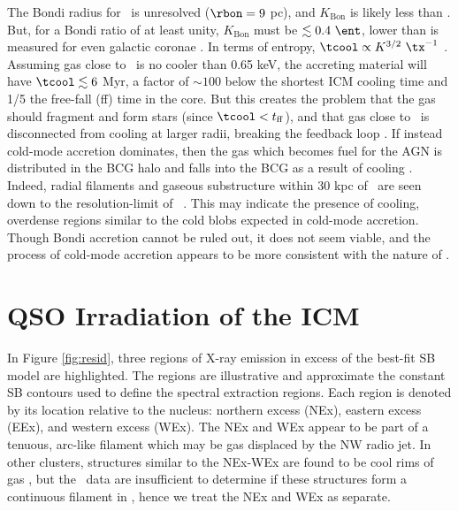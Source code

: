 \documentclass[useAMS,usenatbib]{mn2e}
\begin{document}
The Bondi radius for \irs\ is unresolved ($\rbon = 9$ pc), and
$K_{\mathrm{Bon}}$ is likely less than \kna. But, for a Bondi ratio of
at least unity, $K_{\mathrm{Bon}}$ must be $\la 0.4 ~\ent$, lower than
is measured for even galactic coronae \citep{coronae}. In terms of
entropy, $\tcool \propto K^{3/2} ~\tx^{-1}$ \citep{d06}. Assuming gas
close to \rbon\ is no cooler than 0.65 keV, the accreting material
will have $\tcool \la 6$ Myr, a factor of $\sim 100$ below the
shortest ICM cooling time and 1/5 the free-fall (ff) time in the
core. But this creates the problem that the gas should fragment and
form stars (since $\tcool < t_{\rm{ff}}$), and that gas close to
\rbon\ is disconnected from cooling at larger radii, breaking the
feedback loop \citep{2006NewA...12...38S}. If instead cold-mode
accretion dominates, then the gas which becomes fuel for the AGN is
distributed in the BCG halo and falls into the BCG as a result of
cooling \citep{pizzolato05, 2010arXiv1003.4181P}. Indeed, radial
filaments and gaseous substructure within 30 kpc of \irs\ are seen
down to the resolution-limit of
\hst\ \citep{1999Ap&SS.266..113A}. This may indicate the presence of
cooling, overdense regions similar to the cold blobs expected in
cold-mode accretion. Though Bondi accretion cannot be ruled out, it
does not seem viable, and the process of cold-mode accretion appears
to be more consistent with the nature of \irs.

\section{QSO Irradiation of the ICM}
\label{sec:excess}

In Figure \ref{fig:resid}, three regions of X-ray emission in excess
of the best-fit SB model are highlighted. The regions are illustrative
and approximate the constant SB contours used to define the spectral
extraction regions. Each region is denoted by its location relative to
the nucleus: northern excess (NEx), eastern excess (EEx), and western
excess (WEx). The NEx and WEx appear to be part of a tenuous, arc-like
filament which may be gas displaced by the NW radio jet. In other
clusters, structures similar to the NEx-WEx are found to be cool rims
of gas \citep[\eg][]{2009ApJ...697L..95B}, but the \cxo\ data are
insufficient to determine if these structures form a continuous
filament in \irs, hence we treat the NEx and WEx as separate.
\end{document}
